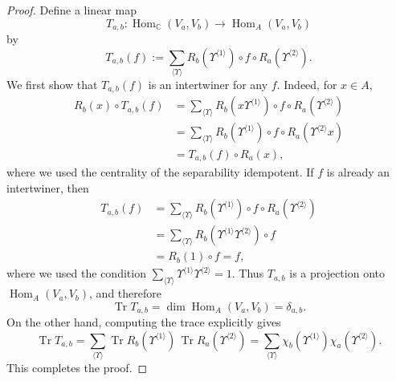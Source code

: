 \documentclass[10pt,a4paper]{amsart}
\newcommand\Tr{\operatorname{Tr}}
\newcommand{\Cbb}{\mathbb{C}}
\newcommand{\Hom}{\operatorname{Hom}}
\begin{document}
\begin{proof}
Define a linear map
\begin{equation*}
T_{a,b}:\Hom_{\Cbb}(V_a,V_b)\longrightarrow \Hom_A(V_a,V_b)
\end{equation*}
by
\begin{equation*}
T_{a,b}(f)
:=
\sum_{\langle \Upsilon\rangle}
R_b(\Upsilon^{\langle 1\rangle})
\circ f \circ
R_a(\Upsilon^{\langle 2\rangle}).
\end{equation*}
We first show that $T_{a,b}(f)$ is an intertwiner for any $f$. Indeed, for $x\in A$,
\begin{equation*}
\begin{aligned}
R_b(x)\circ T_{a,b}(f)
&=
\sum_{\langle \Upsilon\rangle}
R_b(x\Upsilon^{\langle 1\rangle})
\circ f \circ
R_a(\Upsilon^{\langle 2\rangle}) \\
&=
\sum_{\langle \Upsilon\rangle}
R_b(\Upsilon^{\langle 1\rangle})
\circ f \circ
R_a(\Upsilon^{\langle 2\rangle}x) \\
&=
T_{a,b}(f)\circ R_a(x),
\end{aligned}
\end{equation*}
where we used the centrality of the separability idempotent.
If $f$ is already an intertwiner, then
\begin{equation*}
\begin{aligned}
T_{a,b}(f)
&=
\sum_{\langle \Upsilon\rangle}
R_b(\Upsilon^{\langle 1\rangle})
\circ f \circ
R_a(\Upsilon^{\langle 2\rangle}) \\
&=
\sum_{\langle \Upsilon\rangle}
R_b(\Upsilon^{\langle 1\rangle}\Upsilon^{\langle 2\rangle})
\circ f \\
&=
R_b(1)\circ f
=
f,
\end{aligned}
\end{equation*}
where we used the condition
$\sum_{\langle \Upsilon\rangle}
\Upsilon^{\langle 1\rangle}\Upsilon^{\langle 2\rangle}=1$.
Thus $T_{a,b}$ is a projection onto $\Hom_A(V_a,V_b)$, and therefore
\begin{equation*}
\Tr T_{a,b}
=
\dim \Hom_A(V_a,V_b)
=
\delta_{a,b}.
\end{equation*}
On the other hand, computing the trace explicitly gives
\begin{equation*}
\Tr T_{a,b}
=
\sum_{\langle \Upsilon\rangle}
\Tr R_b(\Upsilon^{\langle 1\rangle})
\,
\Tr R_a(\Upsilon^{\langle 2\rangle})
=
\sum_{\langle \Upsilon\rangle}
\chi_b(\Upsilon^{\langle 1\rangle})
\chi_a(\Upsilon^{\langle 2\rangle}).
\end{equation*}
This completes the proof.
\end{proof}
\end{document}
